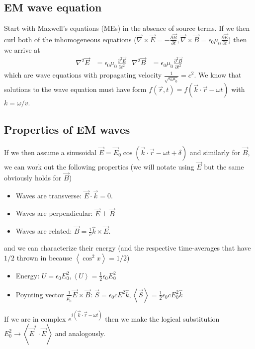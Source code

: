 \documentclass[10pt,twocolumn]{article}
\newcommand{\pd}[2]{\frac{\partial#1}{\partial#2}}
\newcommand{\ptd}[2]{\frac{\partial^2 #1}{\partial#2^2}}
\newcommand{\expvalue}[1]{\left<#1\right>}
\begin{document}
\subsection{EM wave equation}

Start with Maxwell's equations (MEs) in the absence of source terms. If we then curl both of the inhomogeneous equations ($\vec{\nabla} \times \vec{E} = -\pd{\vec{B}}{t}, \vec{\nabla} \times \vec{B} = \epsilon_0\mu_0\pd{\vec{E}}{t}$) then we arrive at
\begin{align}
    \nabla^2 \vec{E} &= \epsilon_0 \mu_0 \ptd{\vec{E}}{t} & \nabla^2 \vec{B} &= \epsilon_0 \mu_0 \ptd{\vec{B}}{t}
\end{align}
which are wave equations with propagating velocity $\frac{1}{\sqrt{\epsilon_0 \mu_0}} = c^2$. We know that solutions to the wave equation must have form $f(\vec{r},t) = f(\vec{k} \cdot \vec{r} - \omega t)$ with $k = \omega/v$.

\subsection{Properties of EM waves}

If we then assume a sinusoidal $\vec{E} = \vec{E}_0 \cos (\vec{k} \cdot \vec{r} - \omega t + \delta)$ and similarly for $\vec{B}$, we can work out the following properties (we will notate using $\vec{E}$ but the same obviously holds for $\vec{B}$)
\begin{itemize}
    \item Waves are transverse: $\vec{E} \cdot \vec{k} = 0$.
    \item Waves are perpendicular: $\vec{E} \perp \vec{B}$
    \item Waves are related: $\vec{B} = \frac{1}{c}\hat{k} \times \vec{E}$.
\end{itemize}
and we can characterize their energy (and the respective time-averages that have $1/2$ thrown in because $\expvalue{\cos^2 x} = 1/2$)
\begin{itemize}
    \item Energy: $U = \epsilon_0 E_0^2, \expvalue{U} = \frac{1}{2}\epsilon_0 E_0^2$
    \item Poynting vector $\frac{1}{\mu_0}\vec{E} \times \vec{B}$: $\vec{S} = \epsilon_0cE^2\hat{k}, \expvalue{\vec{S}} = \frac{1}{2}\epsilon_0 cE_0^2\hat{k}$
\end{itemize}

If we are in complex $e^{i(\vec{k} \cdot \vec{r} - \omega t)}$ then we make the logical substitution $E_0^2 \to \expvalue{\vec{E}^* \cdot \vec{E}}$ and analogously.
\end{document}
